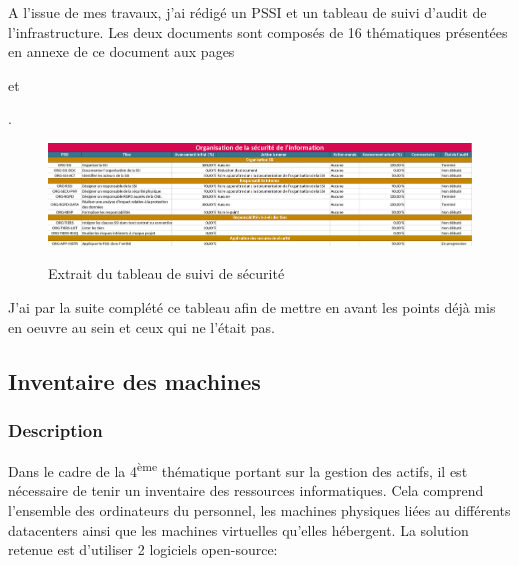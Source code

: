 \documentclass[12pt]{article}
\begin{document}
A l'issue de mes travaux, j'ai rédigé un PSSI et un tableau de suivi d'audit de l'infrastructure. 
Les deux documents sont composés de 16 thématiques présentées en annexe de ce document aux pages \begin{hilite} \pageref{tab:16thematiques1} \end{hilite} et \begin{hilite} \pageref{tab:16thematiques2} \end{hilite}.
\begin{figure}[!ht]
    \centering
    \includegraphics[width=\textwidth]{src/table_ssi.png}
    \label{fig:pssi_table}
    \caption{Extrait du tableau de suivi de sécurité}
\end{figure}

J'ai par la suite complété ce tableau afin de mettre en avant les points déjà mis en oeuvre au sein et ceux qui ne l'était pas.

\newpage
\subsection{Inventaire des machines}
\subsubsection{Description}

Dans le cadre de la 4\textsuperscript{ème} thématique portant sur la gestion des actifs, il est nécessaire de tenir un inventaire des ressources informatiques. 
Cela comprend l'ensemble des ordinateurs du personnel, les machines physiques liées au différents datacenters ainsi que les machines virtuelles qu'elles hébergent.
La solution retenue est d'utiliser 2 logiciels open-source:
\end{document}
